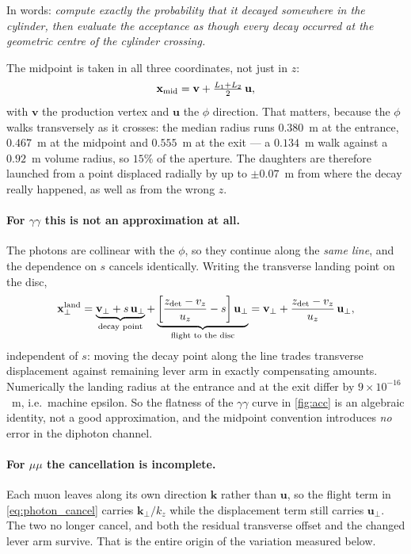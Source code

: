 \documentclass[11pt]{article}
\begin{document}
\noindent In words: \emph{compute exactly the probability that it decayed
somewhere in the cylinder, then evaluate the acceptance as though every decay
occurred at the geometric centre of the cylinder crossing.}

The midpoint is taken in all three coordinates, not just in $z$:
\begin{equation}
  \mathbf{x}_{\rm mid}=\mathbf{v}+\tfrac{L_1+L_2}{2}\,\mathbf{u},
\end{equation}
with $\mathbf{v}$ the production vertex and $\mathbf{u}$ the $\phi$ direction.
That matters, because the $\phi$ walks transversely as it crosses: the median
radius runs $0.380$~m at the entrance, $0.467$~m at the midpoint and $0.555$~m
at the exit --- a $0.134$~m walk against a $0.92$~m volume radius, so $15\%$ of
the aperture. The daughters are therefore launched from a point displaced
radially by up to $\pm0.07$~m from where the decay really happened, as well as
from the wrong $z$.

\paragraph{For $\gamma\gamma$ this is not an approximation at all.} The photons
are collinear with the $\phi$, so they continue along the \emph{same line}, and
the dependence on $s$ cancels identically. Writing the transverse landing point
on the disc,
\begin{equation}
  \mathbf{x}^{\rm land}_\perp
  =\underbrace{\mathbf{v}_\perp+s\,\mathbf{u}_\perp}_{\text{decay point}}
  +\underbrace{\left[\frac{z_{\rm det}-v_z}{u_z}-s\right]\mathbf{u}_\perp}
              _{\text{flight to the disc}}
  =\mathbf{v}_\perp+\frac{z_{\rm det}-v_z}{u_z}\,\mathbf{u}_\perp ,
  \label{eq:photon_cancel}
\end{equation}
independent of $s$: moving the decay point along the line trades transverse
displacement against remaining lever arm in exactly compensating amounts.
Numerically the landing radius at the entrance and at the exit differ by
$9\times10^{-16}$~m, i.e.\ machine epsilon. So the flatness of the
$\gamma\gamma$ curve in \cref{fig:acc} is an algebraic identity, not a good
approximation, and the midpoint convention introduces \emph{no} error in the
diphoton channel.

\paragraph{For $\mu\mu$ the cancellation is incomplete.} Each muon leaves along
its own direction $\mathbf{k}$ rather than $\mathbf{u}$, so the flight term in
\cref{eq:photon_cancel} carries $\mathbf{k}_\perp/k_z$ while the displacement
term still carries $\mathbf{u}_\perp$. The two no longer cancel, and both the
residual transverse offset and the changed lever arm survive. That is the
entire origin of the variation measured below.
\end{document}
